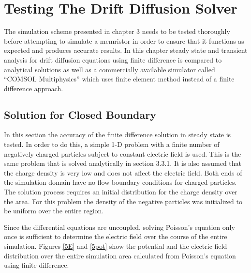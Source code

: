 \chapter{Testing The Drift Diffusion Solver} %

\label{Chapter5} %


\begin{doublespace}

 The simulation scheme presented in chapter 3 needs to be tested thoroughly before attempting to simulate a memristor in order to ensure that it functions as expected and produces accurate results. In this chapter steady state and transient analysis for drift diffusion equations using finite difference is compared to analytical solutions as well as a commercially available simulator called ``COMSOL Multiphysics'' \tjs{}\cite{Comsol} which uses  finite element method instead of a finite difference approach.

\section{Solution for Closed Boundary}
In this section the accuracy of the finite difference solution in steady state is tested. In order to do this, a simple 1-D problem with a finite number of negatively charged particles  subject to constant electric field is used. This is the same problem that is solved analytically in section 3.3.1. It is also assumed that the charge density is very low and does not affect the electric field. Both ends of the simulation domain have no flow boundary conditions for charged particles. The solution process requires an initial distribution for the charge density over the area. For this problem the density of the negative particles was initialized to be uniform over the entire region. 

Since the differential equations are uncoupled, solving Poisson's equation only once is sufficient to determine the electric field over the course of the entire simulation. Figures \ref{5E} and \ref{5pot} show the potential and the electric field distribution over the entire simulation area calculated from Poisson's equation using finite difference. 


\end{doublespace}

